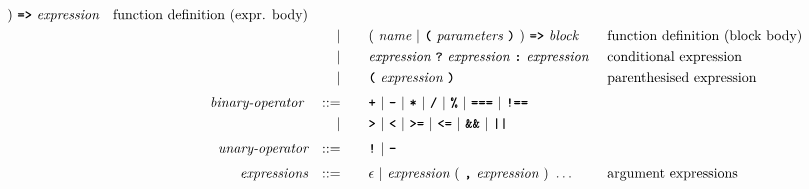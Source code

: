 \begin{alignat*}{9}
                                            )\    
                                            \texttt{\textbf{=>}}\ \textit{expression}
                                                           && \textrm{function definition (expr. body)}\\
&&                       && |   &\quad &&   (\ \textit{name}\ | \
                                               \textbf{\texttt{(}}\ \textit{parameters}\ \textbf{\texttt{)}}\
                                            )\    
                                            \texttt{\textbf{=>}}\ \textit{block}
                                                           && \textrm{function definition (block body)}\\
&&                       && |   &\quad &&   \textit{expression} \ \textbf{\texttt{?}}\ 
                                            \textit{expression}
                                            \ \textbf{\texttt{:}}\
                                            \textit{expression}\
                                                           && \textrm{conditional expression}\\
&&                       && |   &\quad &&  \textbf{\texttt{(}}\  \textit{expression} \ 
                                            \textbf{\texttt{)}} && \textrm{parenthesised expression}\\[1mm]
&& \textit{binary-operator}    \ 
                        && ::= &\quad && \textbf{\texttt{+}}\ |\ \textbf{\texttt{-}}\ |\ \textbf{\texttt{*}}\ |\ \textbf{\texttt{/}}\ |\ \textbf{\texttt{\%}}\ |\ 
                                   \textbf{\texttt{===}}\ |\ \textbf{\texttt{!==}}\ \\
&&                       && |  &\quad &&  \texttt{\textbf{>}}\ |\ \texttt{\textbf{<}}\ |\ \texttt{\textbf{>=}}\ |\ \texttt{\textbf{<=}}\
                                          |\ \textbf{\texttt{\&\&}}\ |\ \texttt{\textbf{||}}\  \\[1mm]
&& \textit{unary-operator}    
                        && ::= &\quad && \textbf{\texttt{!}}\ |\ \textbf{\texttt{-}}\\[1mm]
&& \textit{expressions}  && ::= &\quad && \epsilon\ | \ \textit{expression}\ (
                                                               \ \textbf{\texttt{,}} \
                                                                 \textit{expression} \ 
                                                                      )\ \ldots
                                                            && \textrm{argument expressions} 
\end{alignat*}

\newpage















    
